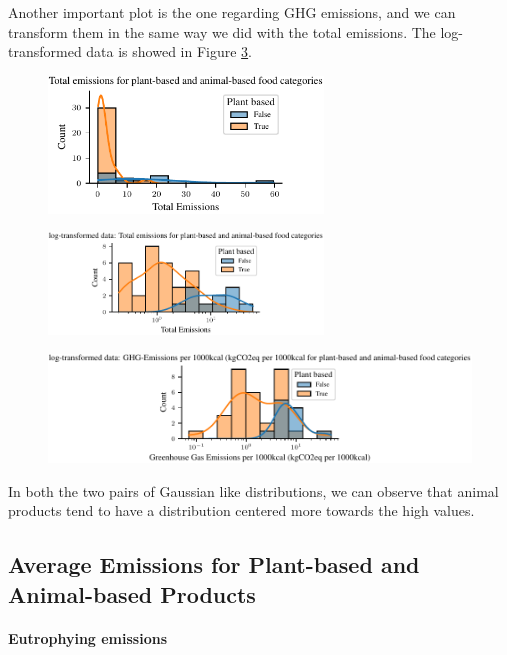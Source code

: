 \documentclass{article}
\begin{document}
Another important plot is the one regarding GHG emissions, and we can transform them in the same way we did with the total emissions. The log-transformed data is showed in Figure \ref{fig:ghg-log}.

\begin{figure}[h]
  \centering
  \includegraphics[width=0.65\textwidth]{figures/emissions.pdf}
  \label{fig:emissions}
\end{figure}

\begin{figure}[h]
  \centering
  \includegraphics[width=0.65\textwidth]{figures/emissions-log.pdf}
  \label{fig:emissions-log}
\end{figure}

\begin{figure}[h]
    \centering
    \includegraphics{figures/ghg-log.pdf}
    \label{fig:ghg-log}
\end{figure}

In both the two pairs of Gaussian like distributions, we can observe that animal products tend to have a distribution centered more towards the high values.

\subsection{Average Emissions for Plant-based and Animal-based Products}
\paragraph{Eutrophying emissions}
\end{document}
